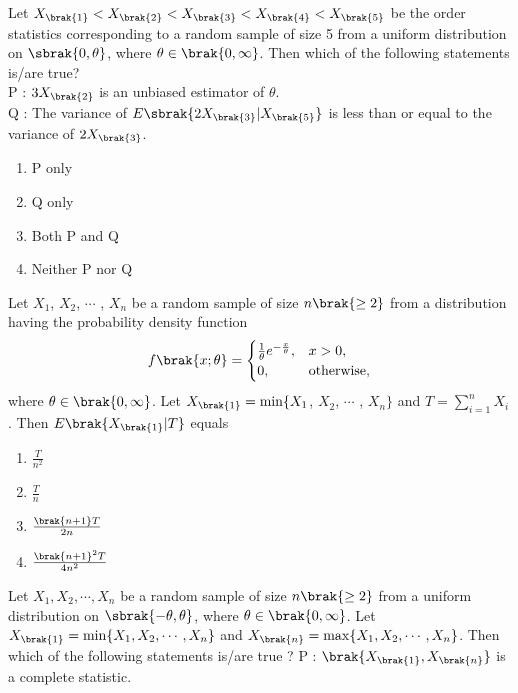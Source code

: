 \item Let $X_{\brak{1}} < X_{\brak{2}} < X_{\brak{3}} < X_{\brak{4}} < X_{\brak{5}}$ be the order statistics corresponding to a random sample of size 5 from a uniform distribution on $\sbrak{0, \theta}$, where $\theta \in \brak{0, \infty}$. Then which of the following statements is/are true?\\
P : $3X_{\brak{2}}$ is an unbiased estimator of $\theta$.\\
Q : The variance of $E\sbrak{2X_{\brak{3}}|X_{\brak{5}}}$ is less than or equal to the variance of $2X_{\brak{3}}$.
\begin{enumerate}
    \item P only
    \item Q only
    \item Both P and Q
    \item Neither P nor Q \\ 
\end{enumerate}
\item Let $X_1$, $X_2$, $\cdots$ , $X_n$ be a random sample of size $n\brak{\geq 2}$ from a distribution having the probability density function
\begin{align*}
    f\brak{x;\theta} = \begin{cases}
        \frac{1}{\theta}e^{-\frac{x}{\theta}}, & x > 0, \\
        0, & \text{otherwise},
    \end{cases}
\end{align*}
where $\theta\in\brak{0, \infty}$. Let $X_{\brak{1}} = \min\{X_1$, $X_2$, $\cdots$ , $X_n\}$ and $T = \sum_{i=1}^nX_i$. Then $E\brak{X_{\brak{1}}|T}$ equals
\begin{enumerate}
    \item $\frac{T}{n^2}$
    \item $\frac{T}{n}$
    \item $\frac{\brak{n+1}T}{2n}$
    \item $\frac{\brak{n+1}^2T}{4n^2}$ \\
\end{enumerate}
\item Let $X_1, X_2, \cdots, X_n$ be a random sample of size $n\brak{\geq 2}$ from a uniform distribution on $\sbrak{-\theta, \theta}$, where $\theta \in \brak{0, \infty}$. Let $X_{\brak{1}} = \min\{X_1, X_2, \cdots, X_n\}$ and $X_{\brak{n}} = \max\{X_1, X_2, \cdots, X_n\} $. Then which of the following statements is/are true ?
P : $\brak{X_{\brak{1}}, X_{\brak{n}}}$ is a complete statistic. \\
